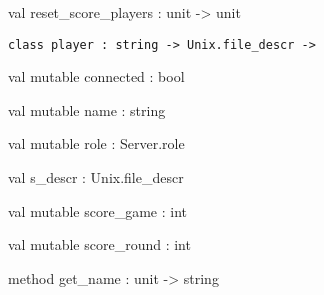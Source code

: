 \documentclass[11pt]{article}
\begin{document}
\label{val:Server.reset-underscorescore-underscoreplayers}\begin{ocamldoccode}
val reset_score_players : unit -> unit
\end{ocamldoccode}




\begin{ocamldoccode}
{\tt{class player : }}{\tt{string -> Unix.file\_descr -> }}\end{ocamldoccode}
\label{class:Server.player}

\begin{ocamldocobjectend}


\label{val:Server.player.connected}\begin{ocamldoccode}
val mutable connected : bool
\end{ocamldoccode}


\label{val:Server.player.name}\begin{ocamldoccode}
val mutable name : string
\end{ocamldoccode}


\label{val:Server.player.role}\begin{ocamldoccode}
val mutable role : Server.role
\end{ocamldoccode}


\label{val:Server.player.s-underscoredescr}\begin{ocamldoccode}
val s_descr : Unix.file_descr
\end{ocamldoccode}


\label{val:Server.player.score-underscoregame}\begin{ocamldoccode}
val mutable score_game : int
\end{ocamldoccode}


\label{val:Server.player.score-underscoreround}\begin{ocamldoccode}
val mutable score_round : int
\end{ocamldoccode}


\label{method:Server.player.get-underscorename}\begin{ocamldoccode}
method get_name : unit -> string
\end{ocamldoccode}



\end{ocamldocobjectend}
\end{document}
